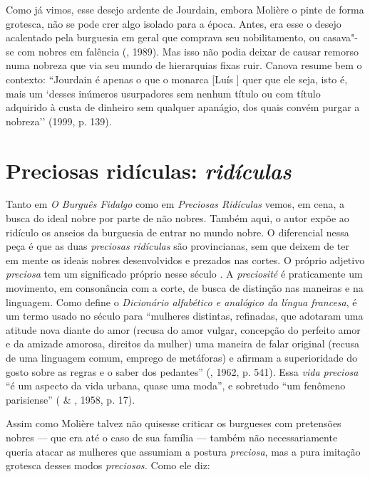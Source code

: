 Como já vimos, esse desejo ardente de Jourdain, embora Molière o pinte
de forma grotesca, não se pode crer algo isolado para a época. Antes,
era esse o desejo acalentado pela burguesia em geral que comprava seu
nobilitamento, ou casava"-se com nobres em falência (, 1989).
Mas isso não podia deixar de causar remorso numa nobreza que via seu
mundo de hierarquias fixas ruir. Canova resume bem o contexto:
``Jourdain é apenas o que o monarca [Luís ] quer que ele seja,
isto é, mais um `desses inúmeros usurpadores sem nenhum título ou com
título adquirido à custa de dinheiro sem qualquer apanágio, dos quais
convém purgar a nobreza'' (1999, p. 139).

\section{Preciosas ridículas: \emph{ridículas}}

Tanto em \emph{O Burguês Fidalgo} como em \emph{Preciosas Ridículas}
vemos, em cena, a busca do ideal nobre por parte de não nobres. Também
aqui, o autor expõe ao ridículo os anseios da burguesia de entrar no
mundo nobre. O diferencial nessa peça é que as duas \emph{preciosas}
\emph{ridículas} são provincianas, sem que deixem de ter em mente os
ideais nobres desenvolvidos e prezados nas cortes. O próprio adjetivo
\emph{preciosa} tem um significado próprio nesse século . A
\emph{preciosité} é praticamente um movimento, em consonância com a
corte, de busca de distinção nas maneiras e na linguagem. Como define o
\emph{Dicionário alfabético e analógico da língua francesa}, é um termo
usado no século  para ``mulheres distintas, refinadas, que adotaram
uma atitude nova diante do amor (recusa do amor vulgar, concepção do
perfeito amor e da amizade amorosa, direitos da mulher) uma maneira de
falar original (recusa de uma linguagem comum, emprego de metáforas) e
afirmam a superioridade do gosto sobre as regras e o saber dos
pedantes'' (, 1962, p. 541). Essa \emph{vida preciosa} ``é um aspecto da vida urbana, quase uma moda'', e sobretudo ``um fenômeno
parisiense'' ( \& , 1958, p. 17).

Assim como Molière talvez não quisesse criticar os burgueses com
pretensões nobres --- que era até o caso de sua família --- também não
necessariamente queria atacar as mulheres que assumiam a postura
\emph{preciosa}, mas a pura imitação grotesca desses modos
\emph{preciosos.} Como ele diz:

